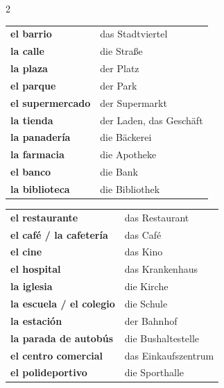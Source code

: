 \documentclass[11pt, a4paper]{article}
\begin{document}
\begin{tcolorbox}[
    colback=kategorie!10,
    colframe=kategorie,
    title={\color{white}\bfseries Los lugares -- Die Orte},
    fonttitle=\bfseries
]

\begin{multicols}{2}
\begin{tabular}{@{}p{5cm}p{4cm}@{}}
\textbf{el barrio} & das Stadtviertel \\
\textbf{la calle} & die Straße \\
\textbf{la plaza} & der Platz \\
\textbf{el parque} & der Park \\
\textbf{el supermercado} & der Supermarkt \\
\textbf{la tienda} & der Laden, das Geschäft \\
\textbf{la panadería} & die Bäckerei \\
\textbf{la farmacia} & die Apotheke \\
\textbf{el banco} & die Bank \\
\textbf{la biblioteca} & die Bibliothek \\
\end{tabular}

\columnbreak

\begin{tabular}{@{}p{5cm}p{4cm}@{}}
\textbf{el restaurante} & das Restaurant \\
\textbf{el café / la cafetería} & das Café \\
\textbf{el cine} & das Kino \\
\textbf{el hospital} & das Krankenhaus \\
\textbf{la iglesia} & die Kirche \\
\textbf{la escuela / el colegio} & die Schule \\
\textbf{la estación} & der Bahnhof \\
\textbf{la parada de autobús} & die Bushaltestelle \\
\textbf{el centro comercial} & das Einkaufszentrum \\
\textbf{el polideportivo} & die Sporthalle \\
\end{tabular}
\end{multicols}

\end{tcolorbox}

\vspace{0.3cm}

\end{document}
